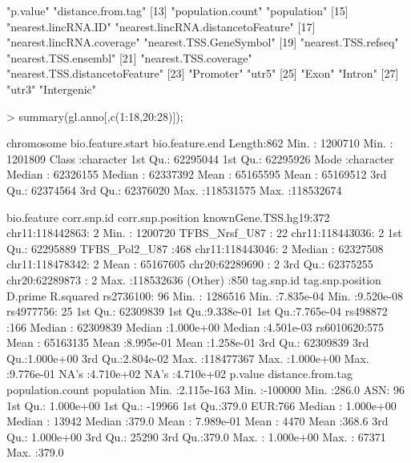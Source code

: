 \documentclass[a4paper]{article}
\begin{document}
\begin{Schunk}
\begin{Soutput}
[11] "p.value"                           "distance.from.tag"                
[13] "population.count"                  "population"                       
[15] "nearest.lincRNA.ID"                "nearest.lincRNA.distancetoFeature"
[17] "nearest.lincRNA.coverage"          "nearest.TSS.GeneSymbol"           
[19] "nearest.TSS.refseq"                "nearest.TSS.ensembl"              
[21] "nearest.TSS.coverage"              "nearest.TSS.distancetoFeature"    
[23] "Promoter"                          "utr5"                             
[25] "Exon"                              "Intron"                           
[27] "utr3"                              "Intergenic"                       
\end{Soutput}
\begin{Sinput}
> summary(gl.anno[,c(1:18,20:28)]);
\end{Sinput}
\begin{Soutput}
  chromosome        bio.feature.start   bio.feature.end    
 Length:862         Min.   :  1200710   Min.   :  1201809  
 Class :character   1st Qu.: 62295044   1st Qu.: 62295926  
 Mode  :character   Median : 62326155   Median : 62337392  
                    Mean   : 65165595   Mean   : 65169512  
                    3rd Qu.: 62374564   3rd Qu.: 62376020  
                    Max.   :118531575   Max.   :118532674  
                                                           
             bio.feature           corr.snp.id  corr.snp.position  
 knownGene.TSS.hg19:372   chr11:118442863:  2   Min.   :  1200720  
 TFBS_Nrsf_U87     : 22   chr11:118443036:  2   1st Qu.: 62295889  
 TFBS_Pol2_U87     :468   chr11:118443046:  2   Median : 62327508  
                          chr11:118478342:  2   Mean   : 65167605  
                          chr20:62289690 :  2   3rd Qu.: 62375255  
                          chr20:62289873 :  2   Max.   :118532636  
                          (Other)        :850                      
     tag.snp.id  tag.snp.position       D.prime            R.squared        
 rs2736100: 96   Min.   :  1286516   Min.   :7.835e-04   Min.   :9.520e-08  
 rs4977756: 25   1st Qu.: 62309839   1st Qu.:9.338e-01   1st Qu.:7.765e-04  
 rs498872 :166   Median : 62309839   Median :1.000e+00   Median :4.501e-03  
 rs6010620:575   Mean   : 65163135   Mean   :8.995e-01   Mean   :1.258e-01  
                 3rd Qu.: 62309839   3rd Qu.:1.000e+00   3rd Qu.:2.804e-02  
                 Max.   :118477367   Max.   :1.000e+00   Max.   :9.776e-01  
                                     NA's   :4.710e+02   NA's   :4.710e+02  
    p.value           distance.from.tag population.count population
 Min.   :2.115e-163   Min.   :-100000   Min.   :286.0    ASN: 96   
 1st Qu.: 1.000e+00   1st Qu.: -19966   1st Qu.:379.0    EUR:766   
 Median : 1.000e+00   Median :  13942   Median :379.0              
 Mean   : 7.989e-01   Mean   :   4470   Mean   :368.6              
 3rd Qu.: 1.000e+00   3rd Qu.:  25290   3rd Qu.:379.0              
 Max.   : 1.000e+00   Max.   :  67371   Max.   :379.0              
                                                                   

\end{Soutput}
\end{Schunk}
\end{document}
